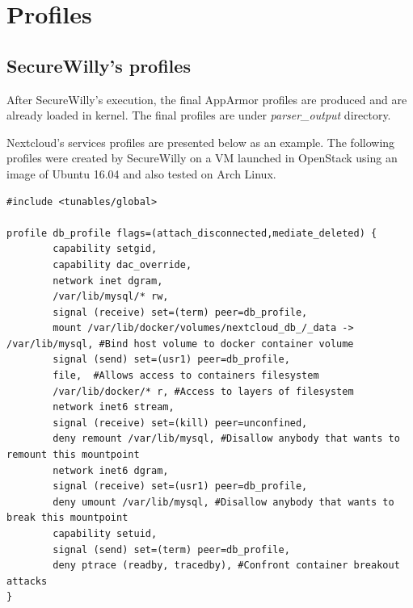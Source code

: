 \section{Profiles}
\subsection{SecureWilly's profiles}
After SecureWilly's execution, the final AppArmor profiles are produced and are already loaded in kernel. The final profiles are under \textit{parser\_output} directory.

Nextcloud's services profiles are presented below as an example. The following profiles were created by SecureWilly on a VM launched in OpenStack using an image of Ubuntu 16.04 and also tested on Arch Linux.

\begin{lstlisting}[style=Dockerfile, caption={AppArmor profile for db service: db\_profile}]
#include <tunables/global>

profile db_profile flags=(attach_disconnected,mediate_deleted) {
        capability setgid,
        capability dac_override,
        network inet dgram,
        /var/lib/mysql/* rw,
        signal (receive) set=(term) peer=db_profile,
        mount /var/lib/docker/volumes/nextcloud_db_/_data -> /var/lib/mysql, #Bind host volume to docker container volume
        signal (send) set=(usr1) peer=db_profile,
        file,  #Allows access to containers filesystem
        /var/lib/docker/* r, #Access to layers of filesystem
        network inet6 stream,
        signal (receive) set=(kill) peer=unconfined,
        deny remount /var/lib/mysql, #Disallow anybody that wants to remount this mountpoint
        network inet6 dgram,
        signal (receive) set=(usr1) peer=db_profile,
        deny umount /var/lib/mysql, #Disallow anybody that wants to break this mountpoint
        capability setuid,
        signal (send) set=(term) peer=db_profile,
        deny ptrace (readby, tracedby), #Confront container breakout attacks
}
\end{lstlisting}

